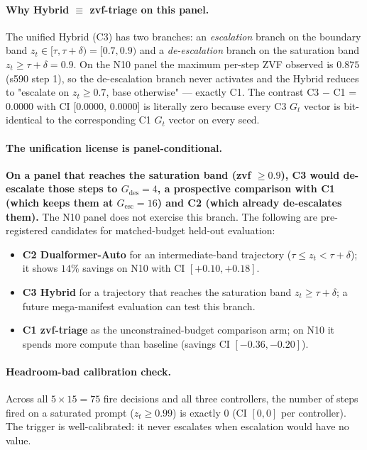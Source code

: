 \paragraph{Why Hybrid $\equiv$ zvf-triage on this panel.}
The unified Hybrid (C3) has two branches: an \emph{escalation} branch
on the boundary band $z_t \in [\tau, \tau{+}\delta) = [0.7, 0.9)$ and a
\emph{de-escalation} branch on the saturation band $z_t \geq \tau{+}\delta = 0.9$.
On the N10 panel the maximum per-step ZVF observed is $0.875$ (s590
step 1), so the de-escalation branch never activates and the Hybrid
reduces to "escalate on $z_t \geq 0.7$, base otherwise" --- exactly C1.
The contrast C3 $-$ C1 = $0.0000$ with CI [$0.0000$, $0.0000$] is
literally zero because every C3 $G_t$ vector is bit-identical to the
corresponding C1 $G_t$ vector on every seed.

\paragraph{The unification license is panel-conditional.}
\textbf{On a panel that reaches the saturation band (zvf $\geq 0.9$), C3 would de-escalate those steps to $G_{\mathrm{des}}{=}4$, a prospective comparison with C1 (which keeps them at $G_{\mathrm{esc}}{=}16$) and C2 (which already de-escalates them).} The N10 panel does not exercise this branch. The following are pre-registered candidates for matched-budget held-out evaluation:
\begin{itemize}
\item \textbf{C2 Dualformer-Auto} for an intermediate-band trajectory
($\tau \leq z_t < \tau{+}\delta$); it shows $14\%$ savings on N10 with
CI $[+0.10, +0.18]$.
\item \textbf{C3 Hybrid} for a trajectory that reaches the saturation band
$z_t \geq \tau{+}\delta$; a future mega-manifest evaluation can test this branch.
\item \textbf{C1 zvf-triage} as the unconstrained-budget comparison arm;
on N10 it spends more compute than baseline (savings CI
$[-0.36, -0.20]$).
\end{itemize}

\paragraph{Headroom-bad calibration check.}
Across all $5 \times 15 = 75$ fire decisions and all three controllers,
the number of steps fired on a saturated prompt ($z_t \geq 0.99$) is
exactly $0$ (CI $[0, 0]$ per controller). The trigger is well-calibrated:
it never escalates when escalation would have no value.

